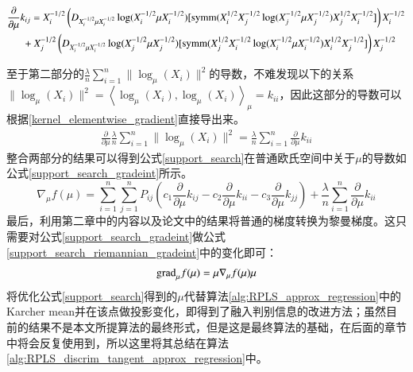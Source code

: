\begin{equation}
\label{kernel_elementwise_gradient}
\begin{split}
&\frac{\partial}{\partial \mu}k_{ij}=X_{i}^{-1/2}\left(D_{X_{i}^{-1/2}\mu X_{i}^{-1/2}}\log(X_{i}^{-1/2}\mu X_{i}^{-1/2})[{\rm symm}(X_{i}^{1/2}X_{j}^{-1/2}\log(X_{j}^{-1/2}\mu X_{j}^{-1/2})X_{j}^{1/2}X_{i}^{-1/2}]\right)X_{i}^{-1/2}\\
&~~~~~~+X_{j}^{-1/2}\left(D_{X_{i}^{-1/2}\mu X_{i}^{-1/2}}\log(X_{j}^{-1/2}\mu X_{j}^{-1/2})[{\rm symm}(X_{j}^{1/2}X_{i}^{-1/2}\log(X_{i}^{-1/2}\mu X_{i}^{-1/2})X_{i}^{1/2}X_{j}^{-1/2}]\right)X_{j}^{-1/2}\\
\end{split}
\end{equation}

至于第二部分的$\frac{\lambda}{n}\sum_{i=1}^{n} \|\log_{\mu}(X_i)\|^2$的导数，不难发现以下的关系$\|\log_{\mu}(X_i)\|^2=\left<\log_{\mu}(X_i),\log_{\mu}(X_i)\right>_{\mu}=k_{ii}$，因此这部分的导数可以根据\ref{kernel_elementwise_gradient}直接导出来。
\begin{equation}
\label{support_search_part2_gradeint}
\begin{split}
\frac{\partial}{\partial \mu}\frac{\lambda}{n}\sum_{i=1}^{n} \|\log_{\mu}(X_i)\|^2=\frac{\lambda}{n}\sum_{i=1}^{n}\frac{\partial}{\partial \mu}k_{ii}
\end{split}
\end{equation}
整合两部分的结果可以得到公式\ref{support_search}在普通欧氏空间中关于$\mu$的导数如公式\ref{support_search_gradeint}所示。
\begin{equation}
\label{support_search_gradeint}
\nabla_{\mu} f(\mu)=\sum_{i=1}^{n}\sum_{j=1}^{n}P_{ij}\left(c_1\frac{\partial}{\partial \mu}k_{ij}-c_2\frac{\partial}{\partial \mu}k_{ii}-c_3\frac{\partial}{\partial \mu}k_{jj}\right)+\frac{\lambda}{n}\sum_{i=1}^{n}\frac{\partial}{\partial \mu}k_{ii}
\end{equation}
最后，利用第二章中的内容以及论文\cite{Statistics_SLEDML,Maniopt_DiscreteCurveFitting}中的结果将普通的梯度转换为黎曼梯度。这只需要对公式\ref{support_search_gradeint}做公式\ref{support_search_riemannian_gradeint}中的变化即可：
\begin{equation}
\label{support_search_riemannian_gradeint}
{\rm grad}_{\mu}f(\mu)=\mu \nabla_{\mu} f(\mu) \mu
\end{equation}
将优化公式\ref{support_search}得到的$\mu$代替算法\ref{alg:RPLS_approx_regression}中的Karcher mean并在该点做投影变化，即得到了融入判别信息的改进方法；虽然目前的结果不是本文所提算法的最终形式，但是这是最终算法的基础，在后面的章节中将会反复使用到，所以这里将其总结在算法\ref{alg:RPLS_discrim_tangent_approx_regression}中。
